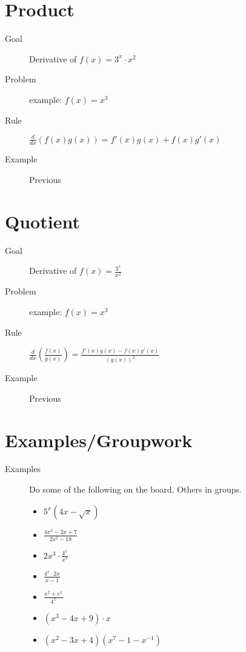 \documentclass[11pt]{article}
\newcommand{\ds}{\displaystyle}
\begin{document}
\drawtitle

\section*{Product}
\begin{description}
\item[Goal] Derivative of $f(x)=3^x\cdot x^2$
\item[Problem] example: $f(x)=x^3$
\item[Rule] $\ds\frac{d}{dx}\left(f(x)g(x)\right)=f'(x)g(x)+f(x)g'(x)$
\item[Example] Previous
\end{description}

\section*{Quotient}
\begin{description}
\item[Goal] Derivative of $f(x)=\ds\frac{3^x}{x^2}$
\item[Problem] example: $f(x)=x^3$
\item[Rule] $\ds\frac{d}{dx}\left(\frac{f(x)}{g(x)}\right)
  =\frac{f'(x)g(x)-f(x)g'(x)}{(g(x))^2}$
\item[Example] Previous
\end{description}

\section*{Examples/Groupwork}
\begin{description}
\item[Examples] Do some of the following on the board.  Others in
  groups.
  \begin{itemize}
  \item $5^x(4x-\sqrt{x})$
  \item $\ds\frac{4x^3-2x+7}{2x^2-18}$
  \item $\ds 2x^3\cdot\frac{4^x}{x^7}$
  \item $\ds \frac{4^x\cdot 2x}{x-1}$
  \item $\ds \frac{x^2+e^x}{4^x}$
  \item $(x^3-4x+9)\cdot x$
  \item $(x^2-3x+4)(x^7-1-x^{-1})$
  \end{itemize}
\end{description}
\end{document}
